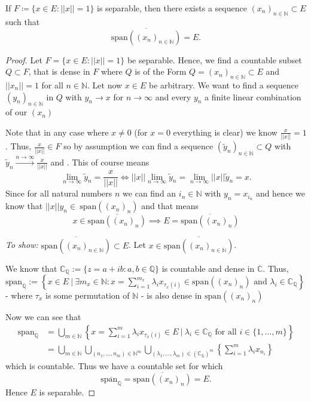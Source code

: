\documentclass[a4paper]{article}
\newcommand{\N}{\mathbb{N}} %
\newcommand{\C}{\mathbb{C}} %
\newcommand{\Q}{\mathbb{Q}} %
\begin{document}
\begin{issue}{}{}
If $F \coloneqq \{ x \in E: ||x|| =1 \}$ is separable, then there exists a sequence $(x_n)_{n \in \mathbb N} \subset E$ such that $$\overline{\mathrm{span}((x_n)_{n \in \mathbb N})} = E.$$
\end{issue}
\begin{proof}
Let $F = \{ x \in E: ||x|| =1 \}$ be separable. Hence, we find a countable subset $Q \subset F$, that is dense in $F$ where $Q$ is of the Form $Q = (x_n)_{n\in\mathbb N}\subset E$ and $||x_n|| = 1$ for all $n\in\mathbb N$. Let now $x\in E$ be arbitrary. We want to find a sequence $(y_n)_{n\in\N}$ in $Q$ with $y_n\to x$ for $n\to\infty$ and every $y_n$ a finite linear combination of our $(x_n)$

Note that in any case where $x\neq 0$ (for $x=0$ everything is clear) we know $\frac{x}{||x||} = 1$. Thus, $\frac{x}{||x||}\in F$ so by assumption we can find a sequence $(\tilde y_n)_{n\in \N} \subset Q $ with $\tilde y_n \overset{n\to\infty}{\longrightarrow} \frac{x}{||x||}$ and . This of course means 
\[
    \lim_{n\to\infty} \tilde y_n = \frac{x}{||x||} \iff ||x||\lim_{n\to\infty}\tilde y_n = \lim_{n\to\infty} ||x||\tilde y_n = x.
\]
Since for all natural numbers $n$ we can find an $i_n\in\N$ with $y_n = x_{i_n}$ and hence we know that $||x||y_n \in\ \mathrm{span}((x_n)_n)$ and that means
\[
    x \in \overline{ \mathrm{span} ((x_n)_n) } \implies E = \overline{\mathrm{span}((x_n)_n)}
\]



\pagebreak
\emph{To show:} $\overline{\mathrm{span}((x_n)_{n \in \mathbb N})} \subset E$. Let $x \in\overline{\mathrm{span}((x_n)_{n \in \mathbb N})}$.

We know that $\C_{\Q} := \{z = a+ib : a,b\in\Q\}$ is countable and dense in $\C$. Thus, $\mathrm{span}_{\Q} := \left\{x \in E\ | \ \exists m_x\in \N: x = \sum_{i=1}^{m_x}\lambda_i x_{\tau_x(i)}\in \mathrm{span}((x_n)_n) \text{ and } \lambda_i \in \C_{\Q}\right\}$ - where $\tau_x$ is some permutation of $\N$ - is also dense in $\mathrm{span}((x_n)_n)$

Now we can see that
\begin{align*}
    \mathrm{span}_\Q &= \bigcup_{m\in\N} \left\{x = \sum_{i=1}^{m}\lambda_i x_{\tau_x(i)} \in E \ | \ \lambda_i \in \C_\Q \text{ for all } i\in\{1,...,m\} \right\}\\
    &= \bigcup_{m\in\N} \bigcup_{(n_1,...,n_m)\in \N^m} \bigcup_{(\lambda_1,...,\lambda_m)\in(\C_\Q)^m} \left\{\sum_{i=1}^{m}\lambda_i x_{n_i}\right\}
\end{align*}
which is countable. Thus we have a countable set for which
\[
    \overline{\mathrm{span}_\Q} = \overline{\mathrm{span}((x_n)_n)} = E.
\]
Hence $E$ is separable.



\end{proof}
\end{document}
